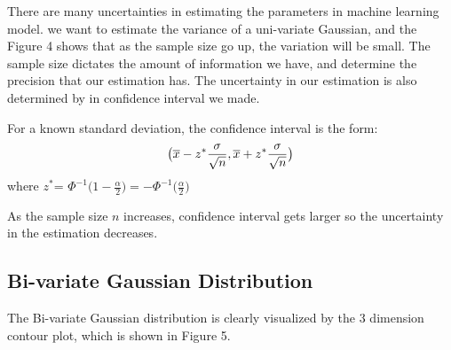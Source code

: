 \documentclass[10pt]{article}
\begin{document}
There are many uncertainties in estimating the parameters in machine learning model. we want to estimate the variance of a uni-variate Gaussian, and the Figure 4 shows that as the sample size go up, the variation will be small. The sample size dictates the amount of information we have, and determine the precision that our estimation has. The uncertainty in our estimation is also determined by in confidence interval we made.

For a known standard deviation, the confidence interval is the form:
\begin{equation}
    \centering
     \big( \overline{x}-z^*\frac{\sigma }{\sqrt{n} } ,\overline{x}+z^*\frac{\sigma }{\sqrt{n} }\big) 
    \centering
\end{equation}
where $z^*$= $\Phi^{-1} \big(1- \frac{\alpha}{2} \big)=- \Phi^{-1}\big(\frac{\alpha}{2}\big)$

As the sample size $n$ increases, confidence interval gets larger so the uncertainty in the estimation decreases. 

\subsection{Bi-variate Gaussian Distribution}

The Bi-variate Gaussian distribution is clearly visualized by the 3 dimension contour plot, which is shown in Figure 5.
\end{document}
